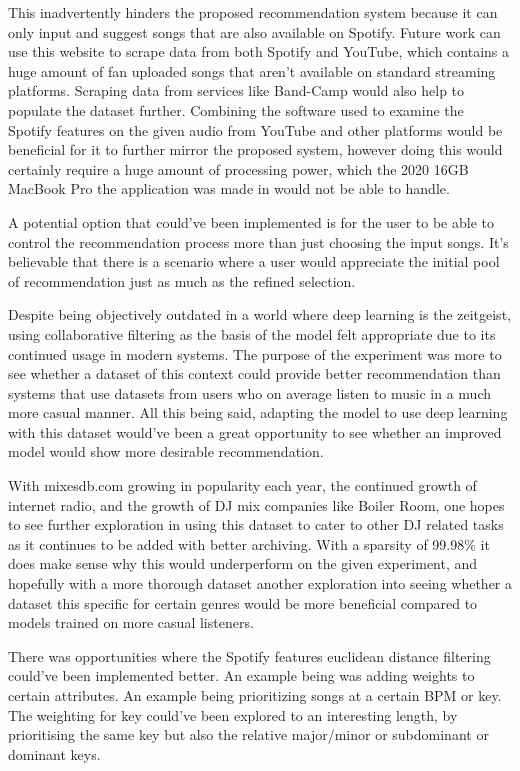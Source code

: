 This inadvertently hinders the proposed recommendation system because it can only input and suggest songs that are also available on Spotify. Future work can use this website to scrape data from both Spotify and YouTube, which contains a huge amount of fan uploaded songs that aren't available on standard streaming platforms. Scraping data from services like Band-Camp would also help to populate the dataset further. Combining the software used to examine the Spotify features on the given audio from YouTube and other platforms would be beneficial for it to further mirror the proposed system, however doing this would certainly require a huge amount of processing power, which the 2020 16GB MacBook Pro the application was made in would not be able to handle.

A potential option that could've been implemented is for the user to be able to control the recommendation process more than just choosing the input songs. It's believable that there is a scenario where a user would appreciate the initial pool of recommendation just as much as the refined selection.

Despite being objectively outdated in a world where deep learning is the zeitgeist, using collaborative filtering as the basis of the model felt appropriate due to its continued usage in modern systems. The purpose of the experiment was more to see whether a dataset of this context could provide better recommendation than systems that use datasets from users who on average listen to music in a much  more casual manner. All this being said, adapting the model to use deep learning with this dataset would've been a great opportunity to see whether an improved model would show more desirable recommendation.

With mixesdb.com growing in popularity each year, the continued growth of internet radio, and the growth of DJ mix companies like Boiler Room, one hopes to see further exploration in using this dataset to cater to other DJ related tasks as it continues to be added with better archiving. With a sparsity of 99.98\% it does make sense why this would underperform on the given experiment, and hopefully with a more thorough dataset another exploration into seeing whether a dataset this specific for certain genres would be more beneficial compared to models trained on more casual listeners. 

There was opportunities where the Spotify features euclidean distance filtering could've been implemented better. An example being was adding weights to certain attributes. An example being prioritizing songs at a certain BPM or key. The weighting for key could've been explored to an interesting length, by prioritising the same key but also the relative major/minor or subdominant or dominant keys.


